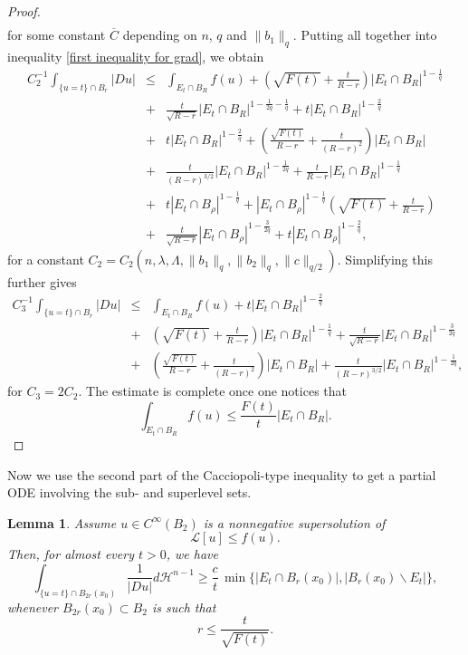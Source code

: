 \documentclass[12pt,a4paper]{amsart}
\numberwithin{equation}{section} %
\newtheorem{lemma}[theorem]{Lemma}
\theoremstyle{definition}
\theoremstyle{remark}
\begin{document}
\begin{proof}
\begin{eqnarray*}
\end{eqnarray*}
for some constant $\overline{C}$ depending on $n$, $q$ and $\|b_1\|_{q}$. Putting all together into inequality \eqref{first inequality for grad}, we obtain
\begin{eqnarray*}
    C_2^{-1}\int_{\{u=t \}  \cap B_r} |Du|  &\leq& \int_{E_t \cap B_R}f(u)+  \left(\sqrt{F(t)} +\frac{t}{R-r} \right)|E_t \cap B_R|^{1 - \frac{1}{q}}\\
    & + & \frac{t}{\sqrt{R-r}}|E_t \cap B_R|^{1 - \frac{1}{2q}-\frac{1}{q}} + t|E_t \cap B_R|^{1-\frac{2}{q}}\\
    & + & t|E_t \cap B_R|^{1-\frac{2}{q}} + \left(\frac{\sqrt{F(t)}}{R-r} + \frac{t}{(R-r)^2} \right)|E_t \cap B_R|\\
    & + & \frac{t}{(R-r)^{3/2}}|E_t \cap B_R|^{1-\frac{1}{2q}}+\frac{t}{R-r}|E_t \cap B_R|^{1-\frac{1}{q}}\\
    & + & t|E_t \cap B_\rho|^{1 - \frac{1}{q}} + |E_t \cap B_\rho|^{1 - \frac{1}{q}}\left(\sqrt{F(t)} + \frac{t}{R-r} \right)\\
    & + & \frac{t}{\sqrt{R-r}}|E_t \cap B_\rho|^{1 - \frac{3}{2q}} + t|E_t \cap B_\rho|^{1 - \frac{2}{q}},
\end{eqnarray*}
for a constant $C_2 = C_2(n,\lambda,\Lambda,\|b_1\|_{q},\|b_2\|_{q},\|c\|_{q/2})$. Simplifying this further gives
\begin{eqnarray*}
    C_3^{-1}\int_{\{u=t \}  \cap B_r} |Du|  &\leq& \int_{E_t \cap B_R}f(u) + t|E_t \cap B_R|^{1-\frac{2}{q}}\\
    & + &\left(\sqrt{F(t)} +\frac{t}{R-r} \right)|E_t \cap B_R|^{1 - \frac{1}{q}} + \frac{t}{\sqrt{R-r}}|E_t \cap B_R|^{1 - \frac{3}{2q}}\\
    & + &\left(\frac{\sqrt{F(t)}}{R-r} + \frac{t}{(R-r)^2} \right)|E_t \cap B_R| + \frac{t}{(R-r)^{3/2}}|E_t \cap B_R|^{1-\frac{1}{2q}},
\end{eqnarray*}
for $C_3 = 2C_2$. The estimate is complete once one notices that
$$
    \int_{E_t \cap B_R} f(u) \leq \frac{F(t)}{t}|E_t \cap B_R|.
$$
\end{proof}

Now we use the second part of the Cacciopoli-type inequality to get a partial ODE involving the sub- and superlevel sets.

\begin{lemma}\label{partial ODE}
Assume $u \in C^{\infty}(B_2)$ is a nonnegative supersolution of
$$
    \mathcal{L}[u] \leq f(u).
$$
Then, for almost every $t>0$, we have
$$
    \int_{\{u=t\}\cap B_{2r}(x_0)} \frac{1}{|Du|}d\mathcal{H}^{n-1} \geq \frac{c}{t}\, \min \big\{|E_t \cap B_r(x_0)|, |B_r(x_0) \backslash E_t| \big\},
$$
whenever $B_{2r}(x_0) \subset B_2$ is such that
\begin{equation}\label{relation between radius and t for partial ode}
    r \leq \frac{t}{\sqrt{F(t)}}.
\end{equation}
\end{lemma}
\end{document}
